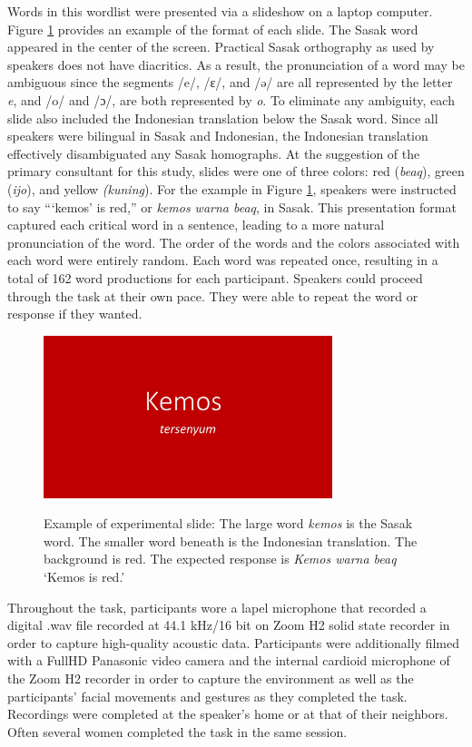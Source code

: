 \documentclass[12pt]{ouparticle}
\begin{document}
Words in this wordlist were presented via a slideshow on a laptop computer. Figure \ref{fig:kemos} provides an example of the format of each slide. The Sasak word appeared in the center of the screen. Practical Sasak orthography as used by speakers does not have diacritics. As a result, the pronunciation of a word may be ambiguous since the segments /e/, /ɛ/, and /ə/ are all represented by the letter \textit{e}, and /o/ and /ɔ/, are both represented by \textit{o}. To eliminate any ambiguity, each slide also included the Indonesian translation below the Sasak word. Since all speakers were bilingual in Sasak and Indonesian, the Indonesian translation effectively disambiguated any Sasak homographs. At the suggestion of the primary consultant for this study, slides were one of three colors: red (\textit{beaq}), green (\textit{ijo}), and yellow \textit{(kuning}). For the example in Figure \ref{fig:kemos}, speakers were instructed to say “‘kemos’ is red,” or \textit{kemos warna beaq}, in Sasak.  This presentation format captured each critical word in a sentence, leading to a more natural pronunciation of the word. The order of the words and the colors associated with each word were entirely random. Each word was repeated once, resulting in a total of 162 word productions for each participant. Speakers could proceed through the task at their own pace. They were able to repeat the word or response if they wanted.

\begin{figure}[ht]
    \centering
    \caption{Example of experimental slide: The large word \textit{kemos} is the Sasak word. The smaller word beneath is the Indonesian translation. The background is red. The expected response is \textit{Kemos warna beaq} `Kemos is red.'}
    \includegraphics[width=0.75\textwidth]{Figure3.jpg}
    \label{fig:kemos}
\end{figure}

Throughout the task, participants wore a lapel microphone that recorded a digital .wav file recorded at 44.1 kHz/16 bit on Zoom H2 solid state recorder in order to capture high-quality acoustic data. Participants were additionally filmed with a FullHD Panasonic video camera and the internal cardioid microphone of the Zoom H2 recorder in order to capture the environment as well as the participants’ facial movements and gestures as they completed the task. Recordings were completed at the speaker’s home or at that of their neighbors. Often several women completed the task in the same session.
\end{document}
